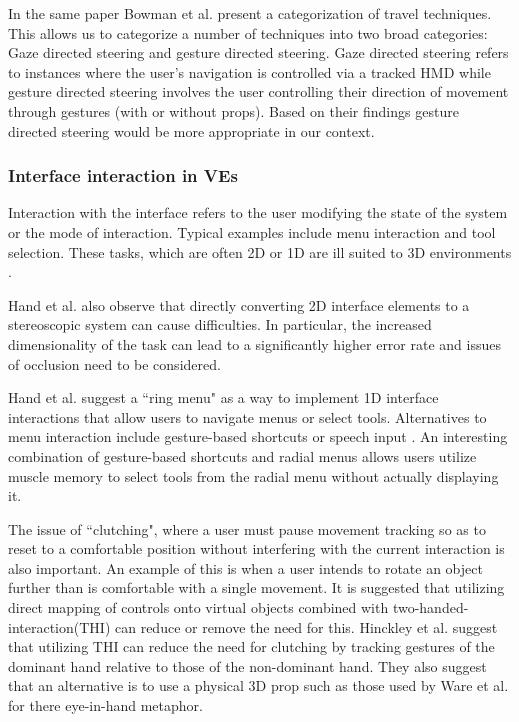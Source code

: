 \documentclass{sig-alternate-05-2015}
\begin{document}
 In the same paper Bowman et al. present a categorization of travel techniques\cite{Bowman1997}. This allows us to categorize a number of techniques into two broad categories: Gaze directed steering and gesture directed steering. Gaze directed steering refers to instances where the user's navigation is controlled via a tracked HMD while gesture directed  steering involves the user controlling their direction of movement through gestures (with or without props). Based on their findings gesture directed steering would be more appropriate in our context.
 


\subsubsection{Interface interaction in VEs}
 Interaction with the interface refers to the user modifying the state of the system or the mode of interaction\cite{Bowman2001}. Typical examples include menu interaction and tool selection. These tasks, which are often 2D or 1D are ill suited to 3D environments \cite{Bowman2001, Hand1997}.
 
 Hand et al. also observe that directly converting 2D interface elements to a stereoscopic system can cause difficulties.\cite{Hand1997} In particular, the increased dimensionality of the task can lead to a significantly higher error rate and issues of occlusion need to be considered.
 
 Hand et al. suggest a ``ring menu" as a way to implement 1D interface interactions that allow users to navigate menus or select tools\cite{Hand1997}. Alternatives to menu interaction include gesture-based shortcuts\cite{Zeleznik2007} or speech input \cite{VanDam1997,Bowman2001,Hand1997}. An interesting combination of gesture-based shortcuts and radial menus allows users utilize muscle memory to select tools from the radial menu without actually displaying it.\cite{Kurtenbach1993}
 
 The issue of ``clutching", where a user must pause movement tracking so as to reset to a comfortable position without interfering with the current interaction is also important\cite{Hand1997}. An example of this is when a user intends to rotate an object further than is comfortable with a single movement. It is suggested that utilizing direct mapping of controls onto virtual objects combined with two-handed-interaction(THI) can reduce or remove the need for this.\cite{Hand1997}  Hinckley et al. suggest that utilizing THI can reduce the need for clutching by tracking gestures of the dominant hand relative to those of the non-dominant hand.\cite{Hinckley1994} They also suggest that an alternative is to use a physical 3D prop such as those used by Ware et al. for there eye-in-hand metaphor\cite{Ware1990}.
 
\end{document}
